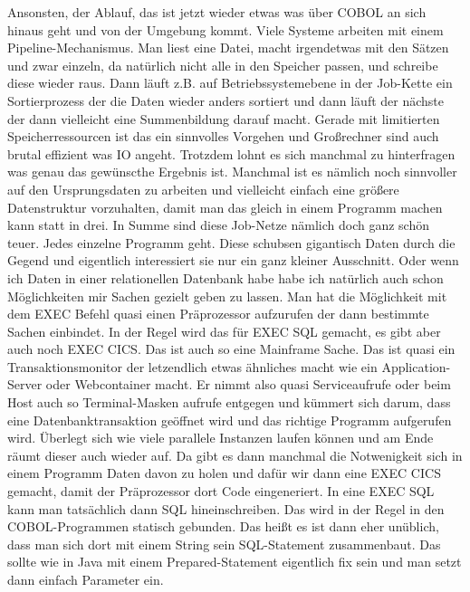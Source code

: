 {Ansonsten, der Ablauf, das ist jetzt wieder etwas was über COBOL an sich hinaus geht und von der Umgebung kommt. Viele Systeme arbeiten mit einem Pipeline-Mechanismus. Man liest eine Datei, macht irgendetwas mit den Sätzen und zwar einzeln, da natürlich nicht alle in den Speicher passen, und schreibe diese wieder raus. Dann läuft z.B. auf Betriebssystemebene in der Job-Kette ein Sortierprozess der die Daten wieder anders sortiert und dann läuft der nächste der dann vielleicht eine Summenbildung darauf macht. Gerade mit limitierten Speicherressourcen ist das ein sinnvolles Vorgehen und Großrechner sind auch brutal effizient was IO angeht. Trotzdem lohnt es sich manchmal zu hinterfragen was genau das gewünscthe Ergebnis ist. Manchmal ist es nämlich noch sinnvoller auf den Ursprungsdaten zu arbeiten und vielleicht einfach eine größere Datenstruktur vorzuhalten, damit man das gleich in einem Programm machen kann statt in drei. In Summe sind diese Job-Netze nämlich doch ganz schön teuer. Jedes einzelne Programm geht. Diese schubsen gigantisch Daten durch die Gegend und eigentlich interessiert sie nur ein ganz kleiner Ausschnitt. Oder wenn ich Daten in einer relationellen Datenbank habe habe ich natürlich auch schon Möglichkeiten mir Sachen gezielt geben zu lassen.
\medskip
Man hat die Möglichkeit mit dem EXEC Befehl quasi einen Präprozessor aufzurufen der dann bestimmte Sachen einbindet. In der Regel wird das für EXEC SQL gemacht, es gibt aber auch noch EXEC CICS. Das ist auch so eine Mainframe Sache. Das ist quasi ein Transaktionsmonitor der letzendlich etwas ähnliches macht wie ein Application-Server oder Webcontainer macht. Er nimmt also quasi Serviceaufrufe oder beim Host auch so Terminal-Masken aufrufe entgegen und kümmert sich darum, dass eine Datenbanktransaktion geöffnet wird und das richtige Programm aufgerufen wird. Überlegt sich wie viele parallele Instanzen laufen können und am Ende räumt dieser auch wieder auf. Da gibt es dann manchmal die Notwenigkeit sich in einem Programm Daten davon zu holen und dafür wir dann eine EXEC CICS gemacht, damit der Präprozessor dort Code eingeneriert. In eine EXEC SQL kann man tatsächlich dann SQL hineinschreiben. Das wird in der Regel in den COBOL-Programmen statisch gebunden. Das heißt es ist dann eher unüblich, dass man sich dort mit einem String sein SQL-Statement zusammenbaut. Das sollte wie in Java mit einem Prepared-Statement eigentlich fix sein und man setzt dann einfach Parameter ein.
\medskip
}



